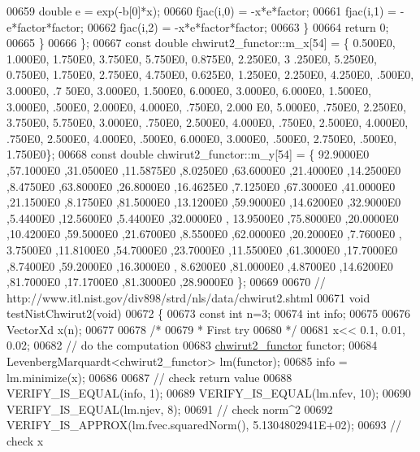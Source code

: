 \begin{DoxyCode}
00659             \textcolor{keywordtype}{double} e = exp(-b[0]*x);
00660             fjac(i,0) = -x*e*factor;
00661             fjac(i,1) = -e*factor*factor;
00662             fjac(i,2) = -x*e*factor*factor;
00663         \}
00664         \textcolor{keywordflow}{return} 0;
00665     \}
00666 \};
00667 \textcolor{keyword}{const} \textcolor{keywordtype}{double} chwirut2\_functor::m\_x[54] = \{ 0.500E0, 1.000E0, 1.750E0, 3.750E0, 5.750E0, 0.875E0, 2.250E0, 3
      .250E0, 5.250E0, 0.750E0, 1.750E0, 2.750E0, 4.750E0, 0.625E0, 1.250E0, 2.250E0, 4.250E0, .500E0, 3.000E0, .7
      50E0, 3.000E0, 1.500E0, 6.000E0, 3.000E0, 6.000E0, 1.500E0, 3.000E0, .500E0, 2.000E0, 4.000E0, .750E0, 2.000
      E0, 5.000E0, .750E0, 2.250E0, 3.750E0, 5.750E0, 3.000E0, .750E0, 2.500E0, 4.000E0, .750E0, 2.500E0, 4.000E0,
       .750E0, 2.500E0, 4.000E0, .500E0, 6.000E0, 3.000E0, .500E0, 2.750E0, .500E0, 1.750E0\};
00668 \textcolor{keyword}{const} \textcolor{keywordtype}{double} chwirut2\_functor::m\_y[54] = \{ 92.9000E0 ,57.1000E0 ,31.0500E0 ,11.5875E0 ,8.0250E0 ,63.6000E0 
      ,21.4000E0 ,14.2500E0 ,8.4750E0 ,63.8000E0 ,26.8000E0 ,16.4625E0 ,7.1250E0 ,67.3000E0 ,41.0000E0 ,21.1500E0 
      ,8.1750E0 ,81.5000E0 ,13.1200E0 ,59.9000E0 ,14.6200E0 ,32.9000E0 ,5.4400E0 ,12.5600E0 ,5.4400E0 ,32.0000E0 ,
      13.9500E0 ,75.8000E0 ,20.0000E0 ,10.4200E0 ,59.5000E0 ,21.6700E0 ,8.5500E0 ,62.0000E0 ,20.2000E0 ,7.7600E0 ,
      3.7500E0 ,11.8100E0 ,54.7000E0 ,23.7000E0 ,11.5500E0 ,61.3000E0 ,17.7000E0 ,8.7400E0 ,59.2000E0 ,16.3000E0 ,
      8.6200E0 ,81.0000E0 ,4.8700E0 ,14.6200E0 ,81.7000E0 ,17.1700E0 ,81.3000E0 ,28.9000E0  \};
00669 
00670 \textcolor{comment}{// http://www.itl.nist.gov/div898/strd/nls/data/chwirut2.shtml}
00671 \textcolor{keywordtype}{void} testNistChwirut2(\textcolor{keywordtype}{void})
00672 \{
00673   \textcolor{keyword}{const} \textcolor{keywordtype}{int} n=3;
00674   \textcolor{keywordtype}{int} info;
00675 
00676   VectorXd x(n);
00677 
00678   \textcolor{comment}{/*}
00679 \textcolor{comment}{   * First try}
00680 \textcolor{comment}{   */}
00681   x<< 0.1, 0.01, 0.02;
00682   \textcolor{comment}{// do the computation}
00683   \hyperlink{structchwirut2__functor}{chwirut2\_functor} functor;
00684   LevenbergMarquardt<chwirut2\_functor> lm(functor);
00685   info = lm.minimize(x);
00686 
00687   \textcolor{comment}{// check return value}
00688   VERIFY\_IS\_EQUAL(info, 1);
00689   VERIFY\_IS\_EQUAL(lm.nfev, 10);
00690   VERIFY\_IS\_EQUAL(lm.njev, 8);
00691   \textcolor{comment}{// check norm^2}
00692   VERIFY\_IS\_APPROX(lm.fvec.squaredNorm(), 5.1304802941E+02);
00693   \textcolor{comment}{// check x}

\end{DoxyCode}
